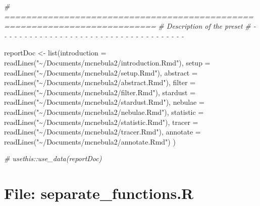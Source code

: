 \documentclass[
]{article}
\newenvironment{Shaded}{\begin{snugshade}}{\end{snugshade}}
\newcommand{\AttributeTok}[1]{\textcolor[rgb]{0.77,0.63,0.00}{#1}}
\newcommand{\CommentTok}[1]{\textcolor[rgb]{0.56,0.35,0.01}{\textit{#1}}}
\newcommand{\FunctionTok}[1]{\textcolor[rgb]{0.00,0.00,0.00}{#1}}
\newcommand{\NormalTok}[1]{#1}
\newcommand{\OtherTok}[1]{\textcolor[rgb]{0.56,0.35,0.01}{#1}}
\newcommand{\StringTok}[1]{\textcolor[rgb]{0.31,0.60,0.02}{#1}}
\begin{document}
\begin{Shaded}
\begin{Highlighting}[]
\CommentTok{\# ==========================================================================}
\CommentTok{\# Description of the preset}
\CommentTok{\# {-} {-} {-} {-} {-} {-} {-} {-} {-} {-} {-} {-} {-} {-} {-} {-} {-} {-} {-} {-} {-} {-} {-} {-} {-} {-} {-} {-} {-} {-} {-} {-} {-} {-} {-} {-} {-}}

\NormalTok{reportDoc }\OtherTok{\textless{}{-}}
  \FunctionTok{list}\NormalTok{(}\AttributeTok{introduction =} \FunctionTok{readLines}\NormalTok{(}\StringTok{"\textasciitilde{}/Documents/mcnebula2/introduction.Rmd"}\NormalTok{),}
       \AttributeTok{setup =} \FunctionTok{readLines}\NormalTok{(}\StringTok{"\textasciitilde{}/Documents/mcnebula2/setup.Rmd"}\NormalTok{),}
       \AttributeTok{abstract =} \FunctionTok{readLines}\NormalTok{(}\StringTok{"\textasciitilde{}/Documents/mcnebula2/abstract.Rmd"}\NormalTok{),}
       \AttributeTok{filter =} \FunctionTok{readLines}\NormalTok{(}\StringTok{"\textasciitilde{}/Documents/mcnebula2/filter.Rmd"}\NormalTok{),}
       \AttributeTok{stardust =} \FunctionTok{readLines}\NormalTok{(}\StringTok{"\textasciitilde{}/Documents/mcnebula2/stardust.Rmd"}\NormalTok{),}
       \AttributeTok{nebulae =} \FunctionTok{readLines}\NormalTok{(}\StringTok{"\textasciitilde{}/Documents/mcnebula2/nebulae.Rmd"}\NormalTok{),}
       \AttributeTok{statistic =} \FunctionTok{readLines}\NormalTok{(}\StringTok{"\textasciitilde{}/Documents/mcnebula2/statistic.Rmd"}\NormalTok{),}
       \AttributeTok{tracer =} \FunctionTok{readLines}\NormalTok{(}\StringTok{"\textasciitilde{}/Documents/mcnebula2/tracer.Rmd"}\NormalTok{),}
       \AttributeTok{annotate =} \FunctionTok{readLines}\NormalTok{(}\StringTok{"\textasciitilde{}/Documents/mcnebula2/annotate.Rmd"}\NormalTok{)}
\NormalTok{  )}

\CommentTok{\# usethis::use\_data(reportDoc)}
\end{Highlighting}
\end{Shaded}

\hypertarget{file-separate_functions.r}{%
\section{File: separate\_functions.R}\label{file-separate_functions.r}}
\end{document}
